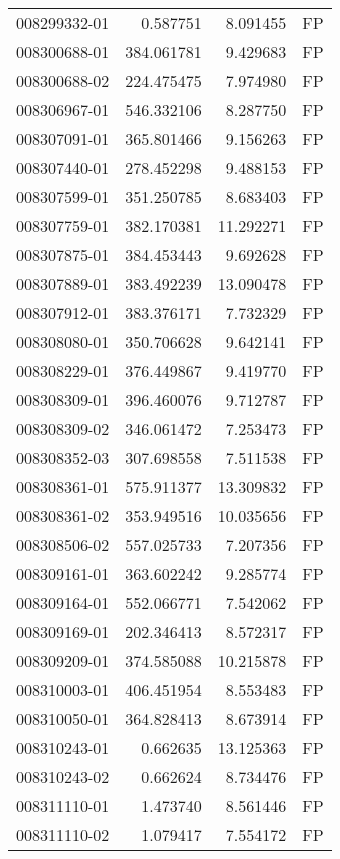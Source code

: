 \begin{tabular}{lrrl}
008299332-01 &    0.587751 &     8.091455 &   FP \\
008300688-01 &  384.061781 &     9.429683 &   FP \\
008300688-02 &  224.475475 &     7.974980 &   FP \\
008306967-01 &  546.332106 &     8.287750 &   FP \\
008307091-01 &  365.801466 &     9.156263 &   FP \\
008307440-01 &  278.452298 &     9.488153 &   FP \\
008307599-01 &  351.250785 &     8.683403 &   FP \\
008307759-01 &  382.170381 &    11.292271 &   FP \\
008307875-01 &  384.453443 &     9.692628 &   FP \\
008307889-01 &  383.492239 &    13.090478 &   FP \\
008307912-01 &  383.376171 &     7.732329 &   FP \\
008308080-01 &  350.706628 &     9.642141 &   FP \\
008308229-01 &  376.449867 &     9.419770 &   FP \\
008308309-01 &  396.460076 &     9.712787 &   FP \\
008308309-02 &  346.061472 &     7.253473 &   FP \\
008308352-03 &  307.698558 &     7.511538 &   FP \\
008308361-01 &  575.911377 &    13.309832 &   FP \\
008308361-02 &  353.949516 &    10.035656 &   FP \\
008308506-02 &  557.025733 &     7.207356 &   FP \\
008309161-01 &  363.602242 &     9.285774 &   FP \\
008309164-01 &  552.066771 &     7.542062 &   FP \\
008309169-01 &  202.346413 &     8.572317 &   FP \\
008309209-01 &  374.585088 &    10.215878 &   FP \\
008310003-01 &  406.451954 &     8.553483 &   FP \\
008310050-01 &  364.828413 &     8.673914 &   FP \\
008310243-01 &    0.662635 &    13.125363 &   FP \\
008310243-02 &    0.662624 &     8.734476 &   FP \\
008311110-01 &    1.473740 &     8.561446 &   FP \\
008311110-02 &    1.079417 &     7.554172 &   FP \\

\end{tabular}
